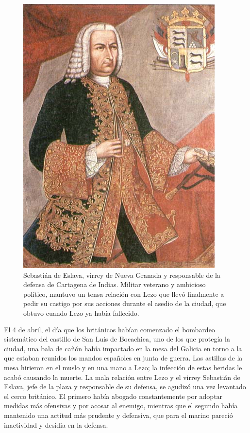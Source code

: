 
\begin{figure}[!hbp]
\centering
\includegraphics[width=.35\textwidth]{jpg_Sebastian_de_Eslava.jpg}
\caption{\label{fig:eslava} Sebastián de Eslava, virrey de Nueva
  Granada y responsable de la defensa de Cartagena de Indias. Militar
  veterano y ambicioso político, mantuvo un tensa relación con Lezo
  que llevó finalmente a pedir su castigo por sus acciones durante el
  asedio de la ciudad, que obtuvo cuando Lezo ya había fallecido.}
\end{figure}

El 4 de abril, el día que los británicos habían comenzado el bombardeo
sistemático del castillo de San Luis de Bocachica, uno de los que
protegía la ciudad, una bala de cañón había impactado en la mesa del
Galicia en torno a la que estaban reunidos los mandos españoles en
junta de guerra. Las astillas de la mesa hirieron en el muslo y en una
mano a Lezo; la infección de estas heridas le acabó causando la
muerte. La mala relación entre Lezo y el virrey Sebastián de Eslava,
jefe de la plaza y responsable de su defensa, se agudizó una vez
levantado el cerco británico. El primero había abogado constantemente
por adoptar medidas más ofensivas y por acosar al enemigo, mientras
que el segundo había mantenido una actitud más prudente y defensiva,
que para el marino pareció inactividad y desidia en la defensa.

